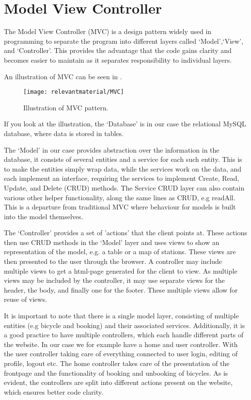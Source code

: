 \section{Model View Controller}\label{sec:mvc}
The Model View Controller (MVC) is a design pattern widely used in programming to separate the program into different layers called `Model',`View', and `Controller'.
This provides the advantage that the code gains clarity and becomes easier to maintain as it separates responsibility to individual layers.

An illustration of MVC can be seen in .
\begin{figure}[h]
	\centering
	\texttt{[image: relevantmaterial/MVC]}
	\caption{Illustration of MVC pattern.}\label{fig:MVC}
\end{figure}

If you look at the illustration, the `Database' is in our case the relational MySQL database, where data is stored in tables.

The `Model' in our case provides abstraction over the information in the database, it consists of several entities and a service for each such entity.
This is to make the entities simply wrap data, while the services work on the data, and each implement an interface, requiring the services to implement Create, Read, Update, and Delete (CRUD) methods. The Service CRUD layer can also contain various other helper functionality, along the same lines as CRUD, e.g readAll. 
This is a departure from traditional MVC where behaviour for models is built into the model themselves.

The `Controller' provides a set of 'actions' that the client points at. 
These actions then use CRUD methods in the `Model' layer and uses views to show an representation of the model, e.g. a table or a map of stations. 
These views are then presented to the user through the browser.
A controller may include multiple views to get a html-page generated for the client to view.
As multiple views may be included by the controller, it may use separate views for the header, the body, and finally one for the footer. 
These multiple views allow for reuse of views.

It is important to note that there is a single model layer, consisting of multiple entities (e.g bicycle and booking) and their associated services.
Additionally, it is a good practice to have multiple controllers, which each handle different parts of the website.
In our case we for example have a home and user controller.
With the user controller taking care of everything connected to user login, editing of profile, logout etc.
The home controller takes care of the presentation of the frontpage and the functionality of booking and unbooking of bicycles.
As is evident, the controllers are split into different actions present on the website, which ensures better code clarity.

